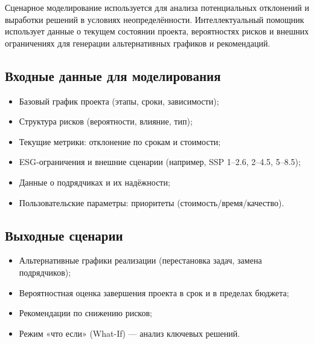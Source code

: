 \documentclass[12pt]{article}
\begin{document}
Сценарное моделирование используется для анализа потенциальных отклонений и выработки решений в условиях неопределённости. Интеллектуальный помощник использует данные о текущем состоянии проекта, вероятностях рисков и внешних ограничениях для генерации альтернативных графиков и рекомендаций.

\subsection{Входные данные для моделирования}
\begin{itemize}
    \item Базовый график проекта (этапы, сроки, зависимости);
    \item Структура рисков (вероятности, влияние, тип);
    \item Текущие метрики: отклонение по срокам и стоимости;
    \item ESG‑ограничения и внешние сценарии (например, SSP 1–2.6, 2–4.5, 5–8.5);
    \item Данные о подрядчиках и их надёжности;
    \item Пользовательские параметры: приоритеты (стоимость/время/качество).
\end{itemize}

\subsection{Выходные сценарии}
\begin{itemize}
    \item Альтернативные графики реализации (перестановка задач, замена подрядчиков);
    \item Вероятностная оценка завершения проекта в срок и в пределах бюджета;
    \item Рекомендации по снижению рисков;
    \item Режим «что если» (What-If) — анализ ключевых решений.
\end{itemize}
\end{document}
